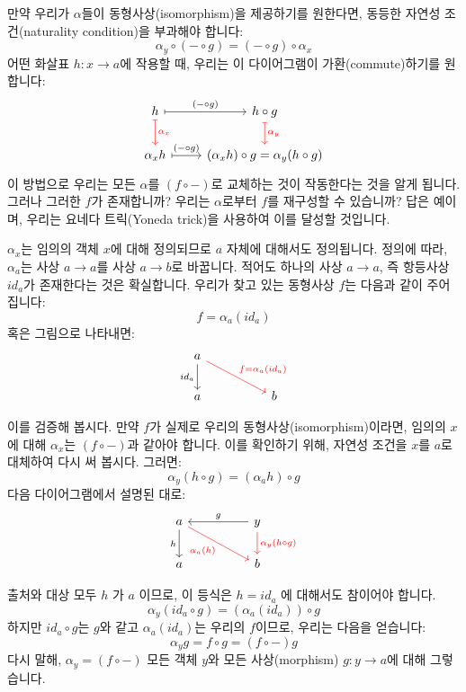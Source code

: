 \documentclass[DaoFP]{subfiles}
\begin{document}
만약 우리가 $\alpha$들이 동형사상(isomorphism)을 제공하기를 원한다면, 동등한 자연성 조건(naturality condition)을 부과해야 합니다:
\[ \alpha_y \circ (- \circ g) = (- \circ g) \circ \alpha_x \]
어떤 화살표 $h \colon x \to a$에 작용할 때, 우리는 이 다이어그램이 가환(commute)하기를 원합니다:
\[
 \begin{tikzcd}
 h
 \arrow[r, mapsto, "(- \circ g)"]
 \arrow[d, mapsto, red, "\alpha_x"]
 & h \circ g
 \arrow[d, mapsto, red, "\alpha_y"]
 \\
 \alpha_x h
 \arrow[r, mapsto, "(- \circ g)"]
&(\alpha_x h) \circ g = \alpha_y (h \circ g)
 \end{tikzcd}
\]
이 방법으로 우리는 모든 $\alpha$를 $(f \circ -)$로 교체하는 것이 작동한다는 것을 알게 됩니다. 그러나 그러한 $f$가 존재합니까? 우리는 $\alpha$로부터 $f$를 재구성할 수 있습니까? 답은 예이며, 우리는 요네다 트릭(Yoneda trick)을 사용하여 이를 달성할 것입니다.

$\alpha_x$는 임의의 객체 $x$에 대해 정의되므로 $a$ 자체에 대해서도 정의됩니다. 정의에 따라, $\alpha_a$는 사상 $a \to a$를 사상 $a \to b$로 바꿉니다. 적어도 하나의 사상 $a \to a$, 즉 항등사상 $id_a$가 존재한다는 것은 확실합니다. 우리가 찾고 있는 동형사상 $f$는 다음과 같이 주어집니다:
\[f = \alpha_a (id_a)\]
혹은 그림으로 나타내면:
\[
 \begin{tikzcd}
a
 \arrow[d, "id_a"']
 \arrow[rrd, red, "f = \alpha_a (id_a)"]
  \\
 a
  && b
 \end{tikzcd}
\]

이를 검증해 봅시다. 만약 $f$가 실제로 우리의 동형사상(isomorphism)이라면, 임의의 $x$에 대해 $\alpha_x$는 $(f \circ -)$과 같아야 합니다. 이를 확인하기 위해, 자연성 조건을 $x$를 $a$로 대체하여 다시 써 봅시다. 그러면:
\[\alpha_y(h \circ g) = (\alpha_a h) \circ g \]
다음 다이어그램에서 설명된 대로:
\[
 \begin{tikzcd}
 a
 \arrow[d, "h"']
 \arrow[rrd,  red, "\alpha_a (h)"']
 && y
 \arrow[ll, "g"']
 \arrow[d, red, "\alpha_y (h \circ g)"]
   \\
 a
  && b
 \end{tikzcd}
\]


출처와 대상 모두 $h$ 가 $a$ 이므로, 이 등식은 $h = id_a$ 에 대해서도 참이어야 합니다.
\[\alpha_y (id_a \circ g) = (\alpha_a (id_a)) \circ g \]
하지만 $id_a \circ g$는 $g$와 같고 $\alpha_a(id_a)$는 우리의 $f$이므로, 우리는 다음을 얻습니다:
\[\alpha_y g = f \circ g = (f \circ -) g\]
다시 말해, $\alpha_y = (f \circ -)$ 모든 객체 $y$와 모든 사상(morphism) $g \colon y \to a$에 대해 그렇습니다.
\end{document}
